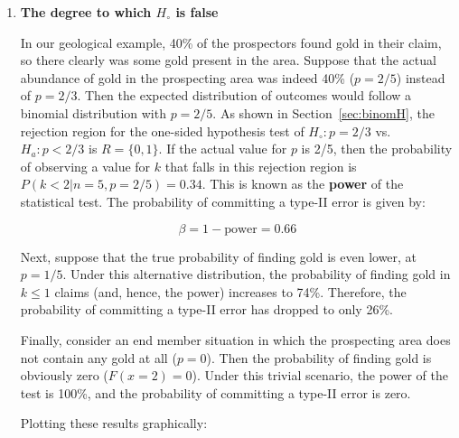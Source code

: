 \begin{enumerate}
\item{\bf The degree to which $H_\circ$ is false}
  
  In our geological example, 40\% of the prospectors found gold in
  their claim, so there clearly was some gold present in the
  area. Suppose that the actual abundance of gold in the prospecting
  area was indeed 40\% ($p=2/5$) instead of $p=2/3$.  Then the
  expected distribution of outcomes would follow a binomial
  distribution with $p=2/5$. As shown in Section~\ref{sec:binomH}, the
  rejection region for the one-sided hypothesis test of $H_\circ:
  p=2/3$ vs. $H_a: p<2/3$ is $R=\{0,1\}$. If the actual value for $p$
  is 2/5, then the probability of observing a value for $k$ that falls
  in this rejection region is $P(k<2|n=5,p=2/5)=0.34$. This is known
  as the \textbf{power} of the statistical test. The probability of
  committing a type-II error is given by:
  
  \begin{equation}
    \beta = 1 - \mbox{power} = 0.66
  \end{equation}

  Next, suppose that the true probability of finding gold is even
  lower, at $p=1/5$. Under this alternative distribution, the
  probability of finding gold in ${k}\leq{1}$ claims (and, hence, the
  power) increases to 74\%. Therefore, the probability of committing a
  type-II error has dropped to only 26\%.

  Finally, consider an end member situation in which the prospecting
  area does not contain any gold at all ($p=0$). Then the probability
  of finding gold is obviously zero ($F(x=2)=0$). Under this trivial
  scenario, the power of the test is 100\%, and the probability of
  committing a type-II error is zero.

  Plotting these results graphically:


\end{enumerate}
